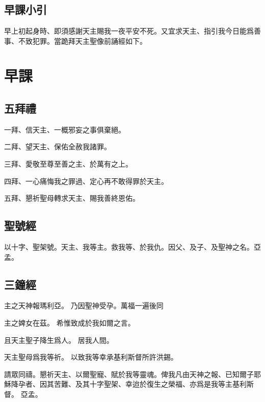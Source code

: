 \chapter[早課]{}
\section*{早課小引}
{\small 早上初起身時、即須感謝天主賜我一夜平安不死。又宜求天主、指引我今日能爲善事、不致犯罪。當跪拜天主聖像前誦經如下。}

\begingroup
\let\clearpage\relax
\chapter*{早課}
\endgroup

\section*{五拜禮}
\noindent 一拜、信天主、一概邪妄之事俱棄絕。

\noindent 二拜、望天主、保佑全赦我諸罪。

\noindent 三拜、愛敬至尊至善之主、於萬有之上。

\noindent 四拜、一心痛悔我之罪過、定心再不敢得罪於天主。

\noindent 五拜、懇祈聖母轉求天主、賜我善終恩佑。

\section*{聖號經}
\pattee 以十字、聖架號。\pattee 天主、我等主。\pattee 救我等、於我仇。\pattee 因父、及子、及聖神之名。{\cspace}亞孟。

\section*{三鐘經}
\versicle 主之天神報瑪利亞。 \response 乃因聖神受孕。{\small 萬福一遍後同}

\versicle 主之婢女在茲。 \response 希惟致成於我如爾之言。

\versicle 且天主聖子降生爲人。 \response 居我人間。

\versicle 天主聖母爲我等祈。 \response 以致我等幸承基利斯督所許洪錫。

\versicle 請眾同禱。{\cspace}懇祈天主、以爾聖寵、賦於我等靈魂。俾我凡由天神之報、已知爾子耶穌降孕者、因其苦難、及其十字聖架、幸迨於復生之榮福、亦爲是我等主基利斯督。 \response 亞孟。


